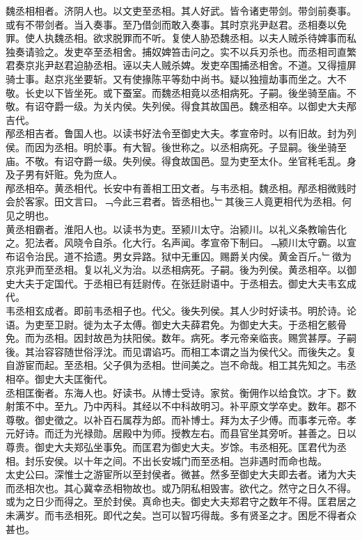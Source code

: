\documentclass{zhvt-classic}
\begin{document}
\hspace*{2em}魏丞相相者。济阴人也。以文吏至丞相。其人好武。皆令诸吏带剑。带剑前奏事。或有不带剑者。当入奏事。至乃借剑而敢入奏事。其时京兆尹赵君。丞相奏以免罪。使人执魏丞相。欲求脱罪而不听。复使人胁恐魏丞相。以夫人贼杀待婢事而私独奏请验之。发吏卒至丞相舍。捕奴婢笞击问之。实不以兵刃杀也。而丞相司直繁君奏京兆尹赵君迫胁丞相。诬以夫人贼杀婢。发吏卒围捕丞相舍。不道。又得擅屏骑士事。赵京兆坐要斩。又有使掾陈平等劾中尚书。疑以独擅劫事而坐之。大不敬。长史以下皆坐死。或下蚕室。而魏丞相竟以丞相病死。子嗣。後坐骑至庙。不敬。有诏夺爵一级。为关内侯。失列侯。得食其故国邑。魏丞相卒。以御史大夫邴吉代。\\
\hspace*{2em}邴丞相吉者。鲁国人也。以读书好法令至御史大夫。孝宣帝时。以有旧故。封为列侯。而因为丞相。明於事。有大智。後世称之。以丞相病死。子显嗣。後坐骑至庙。不敬。有诏夺爵一级。失列侯。得食故国邑。显为吏至太仆。坐官秏毛乱。身及子男有奸赃。免为庶人。\\
\hspace*{2em}邴丞相卒。黄丞相代。长安中有善相工田文者。与韦丞相。魏丞相。邴丞相微贱时会於客家。田文言曰。﹁今此三君者。皆丞相也。﹂其後三人竟更相代为丞相。何见之明也。\\
\hspace*{2em}黄丞相霸者。淮阳人也。以读书为吏。至颍川太守。治颍川。以礼义条教喻告化之。犯法者。风晓令自杀。化大行。名声闻。孝宣帝下制曰。﹁颍川太守霸。以宣布诏令治民。道不拾遗。男女异路。狱中无重囚。赐爵关内侯。黄金百斤。﹂徵为京兆尹而至丞相。复以礼义为治。以丞相病死。子嗣。後为列侯。黄丞相卒。以御史大夫于定国代。于丞相已有廷尉传。在张廷尉语中。于丞相去。御史大夫韦玄成代。\\
\hspace*{2em}韦丞相玄成者。即前韦丞相子也。代父。後失列侯。其人少时好读书。明於诗。论语。为吏至卫尉。徙为太子太傅。御史大夫薛君免。为御史大夫。于丞相乞骸骨免。而为丞相。因封故邑为扶阳侯。数年。病死。孝元帝亲临丧。赐赏甚厚。子嗣後。其治容容随世俗浮沈。而见谓谄巧。而相工本谓之当为侯代父。而後失之。复自游宦而起。至丞相。父子俱为丞相。世间美之。岂不命哉。相工其先知之。韦丞相卒。御史大夫匡衡代。\\
\hspace*{2em}丞相匡衡者。东海人也。好读书。从博士受诗。家贫。衡佣作以给食饮。才下。数射策不中。至九。乃中丙科。其经以不中科故明习。补平原文学卒史。数年。郡不尊敬。御史徵之。以补百石属荐为郎。而补博士。拜为太子少傅。而事孝元帝。孝元好诗。而迁为光禄勋。居殿中为师。授教左右。而县官坐其旁听。甚善之。日以尊贵。御史大夫郑弘坐事免。而匡君为御史大夫。岁馀。韦丞相死。匡君代为丞相。封乐安侯。以十年之间。不出长安城门而至丞相。岂非遇时而命也哉。\\
\hspace*{2em}太史公曰。深惟士之游宦所以至封侯者。微甚。然多至御史大夫即去者。诸为大夫而丞相次也。其心冀幸丞相物故也。或乃阴私相毁害。欲代之。然守之日久不得。或为之日少而得之。至於封侯。真命也夫。御史大夫郑君守之数年不得。匡君居之未满岁。而韦丞相死。即代之矣。岂可以智巧得哉。多有贤圣之才。困戹不得者众甚也。\\
\end{document}

